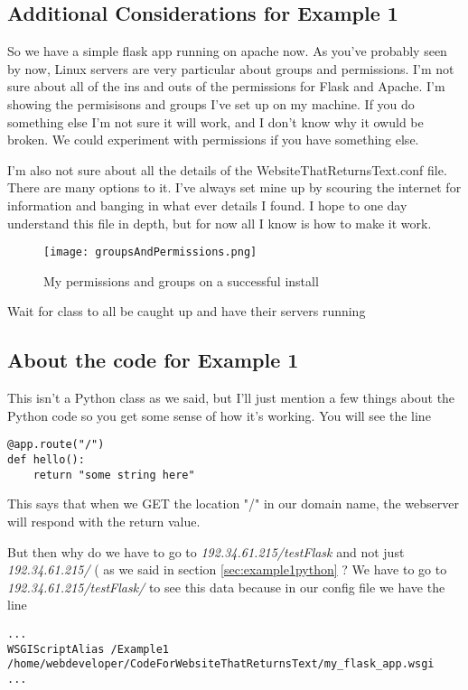\documentclass[10pt]{article}
\begin{document}
\subsection{Additional Considerations for Example 1}
So we have a simple flask app running on apache now. As you've probably seen by now, Linux servers are very particular about groups and permissions. I'm not sure about all of the ins and outs of the permissions for Flask and Apache. I'm showing the permisisons and groups I've set up on my machine. If you do something else I'm not sure it will work, and I don't know why it owuld be broken. We could experiment with permissions if you have something else.


I'm also not sure about all the details of the WebsiteThatReturnsText.conf file. There are many options to it. I've always set mine up by scouring the internet for information and banging in what ever details I found. I hope to one day understand this file in depth, but for now all I know is how to make it work.

\begin{figure}[h]
  \centering
    \texttt{[image: groupsAndPermissions.png]}
  \caption{My permissions and groups on a successful install}
\end{figure}

{\LARGE Wait for class to all be caught up and have their servers running}

\subsection{About the code for Example 1}
This isn't a Python class as we said, but I'll just mention a few things about the Python code so you get some sense of how it's working. You will see the line

\begin{lstlisting}[style=py]
@app.route("/")
def hello():
	return "some string here"
\end{lstlisting}
 
This says that when we GET the location "/" in our domain name, the webserver will respond with the return value.

But then why do we have to go to \textit{192.34.61.215/testFlask} and not just
\textit{192.34.61.215/} ( as we said in section \ref{sec:example1python} ? We
have to go to \textit{192.34.61.215/testFlask/} to see this data because in our config file we have the line

\begin{lstlisting}[style=sh]
...
WSGIScriptAlias /Example1 /home/webdeveloper/CodeForWebsiteThatReturnsText/my_flask_app.wsgi
...
\end{lstlisting}
\end{document}
